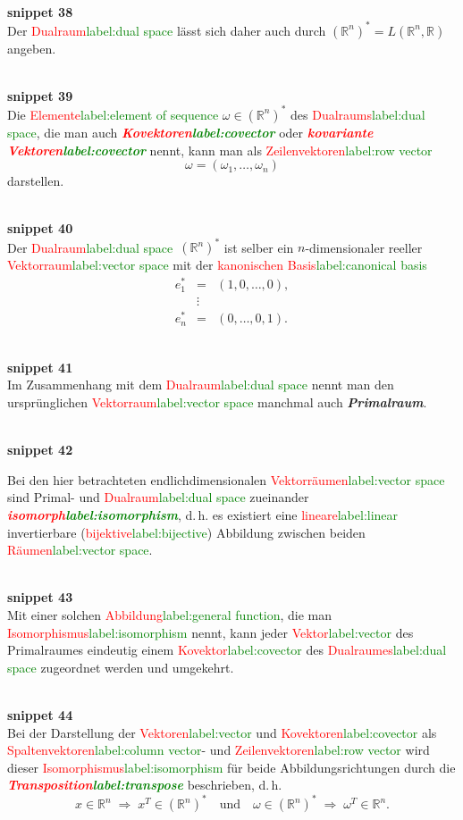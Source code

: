 \documentclass[a4paper,twoside,english,ngerman,deutsch,german,sectrefs,envcountsame,envcountchap]{svmono}
\newcommand{\setref}[2]{\textcolor{red}{#1}\textcolor{green}{#2}}
\newcommand{\snippet}[1]{\\\textbf{snippet #1}\\}
\begin{document}
\snippet{38}
Der \setref{Dualraum}{label:dual space} lässt sich daher auch durch $({\mathbb{R}}^{n})^{*}=L({\mathbb{R}}^{n},{\mathbb{R}})$ angeben.

\snippet{39}
Die \setref{Elemente}{label:element of sequence} $\omega\in({\mathbb{R}}^{n})^{*}$ des \setref{Dualraums}{label:dual space}, die man auch \textbf{\em \setref{Kovektoren}{label:covector}} oder \textbf{\em \setref{kovariante Vektoren}{label:covector}} nennt, kann man als \setref{Zeilenvektoren}{label:row vector}
\[
\omega=\left(\omega_{1},\ldots,\omega_{n}\right)
\]
darstellen.

\snippet{40}
Der \setref{Dualraum}{label:dual space}~$({\mathbb{R}}^{n})^{*}$ ist selber ein $n$-dimensionaler reeller \setref{Vektorraum}{label:vector space} mit der \setref{kanonischen Basis}{label:canonical basis}
\[
\begin{array}{lcl}
e_{1}^{*} & = & \left(1,0,\ldots,0\right),\\
 & \vdots\\
e_{n}^{*} & = & (0,\ldots,0,1).
\end{array}
\]

\snippet{41}
Im Zusammenhang mit dem \setref{Dualraum}{label:dual space} nennt man den ursprünglichen \setref{Vektorraum}{label:vector space} manchmal auch \textbf{\em Primalraum}.

\snippet{42}
\begin{remark}
\label{rem:Isomorphismus-Primal-Dual}Bei den hier betrachteten endlichdimensionalen
\setref{Vektorräumen}{label:vector space} sind Primal- und \setref{Dualraum}{label:dual space} zueinander \textbf{\em \setref{isomorph}{label:isomorphism}},
d.\,h. es existiert eine \setref{lineare}{label:linear} invertierbare (\setref{bijektive}{label:bijective}) Abbildung zwischen beiden \setref{Räumen}{label:vector space}.
\end{remark}

\snippet{43}
Mit einer solchen \setref{Abbildung}{label:general function}, die man \setref{Isomorphismus}{label:isomorphism} nennt, kann jeder \setref{Vektor}{label:vector} des Primalraumes eindeutig einem \setref{Kovektor}{label:covector} des \setref{Dualraumes}{label:dual space} zugeordnet werden und umgekehrt.

\snippet{44}
Bei der Darstellung der \setref{Vektoren}{label:vector} und \setref{Kovektoren}{label:covector} als \setref{Spaltenvektoren}{label:column vector}- und \setref{Zeilenvektoren}{label:row vector} wird dieser
\setref{Isomorphismus}{label:isomorphism} für beide Abbildungsrichtungen durch die \textbf{\em \setref{Transposition}{label:transpose}}
beschrieben, d.\,h.
\[
x\in{\mathbb{R}}^{n}\;\Rightarrow\;x^{T}\in({\mathbb{R}}^{n})^{*}\quad\text{und}\quad\omega\in({\mathbb{R}}^{n})^{*}\;\Rightarrow\;\omega^{T}\in{\mathbb{R}}^{n}.
\]
\end{document}
